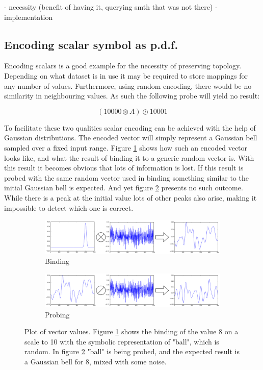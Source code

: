 \documentclass[conference]{IEEEtran}
\begin{document}
	- necessity (benefit of having it, querying smth that was not there)
	- implementation
	

 
	
	\subsection{Encoding scalar symbol as p.d.f.}
	
	Encoding scalars is a good example for the necessity of preserving topology.
Depending on what dataset is in use it may be required to store mappings for any number of values.
Furthermore, using random encoding, there would be no similarity in neighbouring values.
As such the following probe will yield no result:
	
	\begin{equation}
	(10000 \otimes A) \oslash 10001
	\end{equation}
	
	To facilitate these two qualities scalar encoding can be achieved with the help of Gaussian distributions.
The encoded vector will simply represent a Gaussian bell sampled over a fixed input range.
Figure \ref{no-perm-a} shows how such an encoded vector looks like, and what the result of binding it to a generic random vector is.
With this result it becomes obvious that lots of information is lost.
If this result is probed with the same random vector used in binding something similar to the initial Gaussian bell is expected.
And yet figure \ref{no-perm-b} presents no such outcome.
While there is a peak at the initial value lots of other peaks also arise, making it impossible to detect which one is correct.

	
	\begin{figure}
		\begin{subfigure}{1\columnwidth}
			\includegraphics[width=\columnwidth]{img/scalar-pre-perm.png}
			\caption{Binding}
			\label{no-perm-a}
		\end{subfigure}
		\begin{subfigure}{1\columnwidth}
			\includegraphics[width=\columnwidth]{img/scalar-pre-perm-probe.png}
			\caption{Probing}
			\label{no-perm-b}
		\end{subfigure}
		\caption{Plot of vector values.
Figure \ref{no-perm-a} shows the binding of the value 8 on a scale to 10 with the symbolic representation of "ball", which is random.
In figure \ref{no-perm-b} "ball" is being probed, and the expected result is a Gaussian bell for 8, mixed with some noise.}
		\label{no-perm}
	\end{figure}
	
\end{document}
